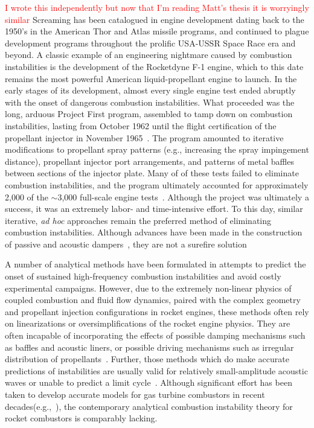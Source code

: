 \textcolor{red}{I wrote this independently but now that I'm reading Matt's thesis it is worryingly similar} Screaming has been catalogued in engine development dating back to the 1950's in the American Thor and Atlas missile programs, and continued to plague development programs throughout the prolific USA-USSR Space Race era and beyond. A classic example of an engineering nightmare caused by combustion instabilities is the development of the Rocketdyne F-1 engine, which to this date remains the most powerful American liquid-propellant engine to launch. In the early stages of its development, almost every single engine test ended abruptly with the onset of dangerous combustion instabilities. What proceeded was the long, arduous Project First program, assembled to tamp down on combustion instabilities, lasting from October 1962 until the flight certification of the propellant injector in November 1965~\cite{Young2008}. The program amounted to iterative modifications to propellant spray patterns (e.g., increasing the spray impingement distance), propellant injector port arrangements, and patterns of metal baffles between sections of the injector plate. Many of of these tests failed to eliminate combustion instabilities, and the program ultimately accounted for approximately 2,000 of the $\sim$3,000 full-scale engine tests~\cite{Oefelein1993}. Although the project was ultimately a success, it was an extremely labor- and time-intensive effort. To this day, similar iterative, \textit{ad hoc} approaches remain the preferred method of eliminating combustion instabilities. Although advances have been made in the construction of passive and acoustic dampers~\cite{Zhao2015}, they are not a surefire solution

A number of analytical methods have been formulated in attempts to predict the onset of sustained high-frequency combustion instabilities and avoid costly experimental campaigns. However, due to the extremely non-linear physics of coupled combustion and fluid flow dynamics, paired with the complex geometry and propellant injection configurations in rocket engines, these methods often rely on linearizations or oversimplifications of the rocket engine physics. They are often incapable of incorporating the effects of possible damping mechanisms such as baffles and acoustic liners, or possible driving mechanisms such as irregular distribution of propellants~\cite{Yang1995}. Further, those methods which do make accurate predictions of instabilities are usually valid for relatively small-amplitude acoustic waves or unable to predict a limit cycle~\cite{Culick1994}. Although significant effort has been taken to develop accurate models for gas turbine combustors in recent decades(e.g.,~\cite{Noiray2008}), the contemporary analytical combustion instability theory for rocket combustors is comparably lacking.


